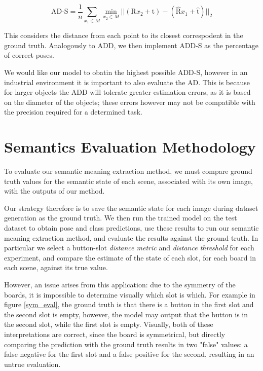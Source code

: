 \begin{equation*}
    \text{AD-S} = \frac{1}{n} \sum_{x_1 \in M} \min_{x_2 \in M} ||(\text{R}x_2 + \text{t}) - 
    (\hat{\text{R}}x_1 + \hat{\text{t}})||_2
\end{equation*}

This considers the distance from each point to its closest correspodent in the ground truth. Analogously to ADD, we then implement ADD-S as the percentage of correct poses.

We would like our model to obatin the highest possible ADD-S, however in an industrial environment it is important to also evaluate the AD. This is because for larger objects the ADD will tolerate greater estimation errors, as it is based on the diameter of the objects; these errors however may not be compatible with the precision required for a determined task.

\section{Semantics Evaluation Methodology}
\label{semantics_method_section}

To evaluate our semantic meaning extraction method, we must compare ground truth values for the semantic state of each scene, associated with its own image, with the outputs of our method.

Our strategy therefore is to save the semantic state for each image during dataset generation as the ground truth. We then run the trained model on the test dataset to obtain pose and class predictions, use these results to run our semantic meaning extraction method, and evaluate the results against the ground truth. In particular we select a button-slot \emph{distance metric} and \emph{distance threshold} for each experiment, and compare the estimate of the state of each slot, for each board in each scene, against its true value.

However, an issue arises from this application: due to the symmetry of the boards, it is impossible to determine visually which slot is which. For example in figure \ref{sym_eval}, the ground truth is that there is a button in the first slot and the second slot is empty, however, the model may output that the button is in the second slot, while the first slot is empty. Visually, both of these interpretations are correct, since the board is symmetrical, but directly comparing the prediction with the ground truth results in two "false" values: a false negative for the first slot and a false positive for the second, resulting in an untrue evaluation.

